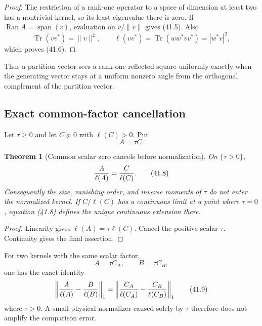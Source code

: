 \documentclass[11pt]{article}
\newtheorem{theorem}{Theorem}[section]
\theoremstyle{remark}
\begin{document}
\begin{proof}
The restriction of a rank-one operator to a space of dimension at
least two has a nontrivial kernel, so its least eigenvalue there is
zero.  If \(\operatorname{Ran}A=\operatorname{span}(v)\), evaluation
on \(v/\|v\|\) gives (41.5).  Also
\[
 \operatorname{Tr}(vv^*)=\|v\|^2,\qquad
 \ell(vv^*)=\operatorname{Tr}(ww^*vv^*)=|w^*v|^2,
\]
which proves (41.6).
\end{proof}

Thus a partition vector sees a rank-one reflected square uniformly
exactly when the generating vector stays at a uniform nonzero angle
from the orthogonal complement of the partition vector.

\subsection{Exact common-factor cancellation}

Let \(\tau\geq0\) and let \(C\succeq0\) with \(\ell(C)>0\).  Put
\[
                         A=\tau C.               \tag{41.7}
\]

\begin{theorem}[Common scalar zero cancels before normalization]
\label{thm:v12v41-common-factor}
On \(\{\tau>0\}\),
\begin{equation}
 {A\over\ell(A)}={C\over\ell(C)}.                 \tag{41.8}
\end{equation}
Consequently the size, vanishing order, and inverse moments of
\(\tau\) do not enter the normalized kernel.  If
\(C/\ell(C)\) has a continuous limit at a point where \(\tau=0\),
equation (41.8) defines the unique continuous extension there.
\end{theorem}

\begin{proof}
Linearity gives \(\ell(A)=\tau\ell(C)\).  Cancel the positive scalar
\(\tau\).  Continuity gives the final assertion.
\end{proof}

For two kernels with the same scalar factor,
\[
 A=\tau C_A,\qquad B=\tau C_B,
\]
one has the exact identity
\begin{equation}
 \left\|
 {A\over\ell(A)}-{B\over\ell(B)}
 \right\|_1
 =
 \left\|
 {C_A\over\ell(C_A)}-{C_B\over\ell(C_B)}
 \right\|_1                                      \tag{41.9}
\end{equation}
where \(\tau>0\).  A small physical normalizer caused solely by
\(\tau\) therefore does not amplify the comparison error.
\end{document}

